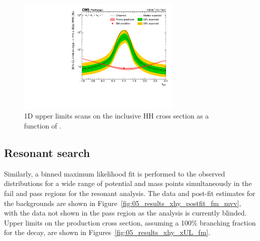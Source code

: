 \begin{figure}[hbt!]
\centering
\includegraphics[width=0.7\textwidth]{figures/05-HH/results_nonres/UL_scan_C2V.pdf}
\caption{1D upper limits scans on the inclusive HH cross section as a function of \kapvv.
\label{fig:05_results_hh_UL_k2v}
}
\end{figure}


\subsection{Resonant \texorpdfstring{\XHY}{XHY} search}
\label{sec:05_results_xhy}

Similarly, a binned maximum likelihood fit is performed to the observed \mxmy distributions for a wide range of potential \PX and \PY mass points simultaneously in the fail and pass regions for the resonant analysis.
The data and post-fit estimates for the backgrounds are shown in Figure~\ref{fig:05_results_xhy_postfit_fm_mvv}, with the data not shown in the pass region as the analysis is currently blinded.
Upper limits on the \XHY production cross section, assuming a 100\% branching fraction for the \yvv decay, are shown in Figures~\ref{fig:05_results_xhy_xUL_fm}.


